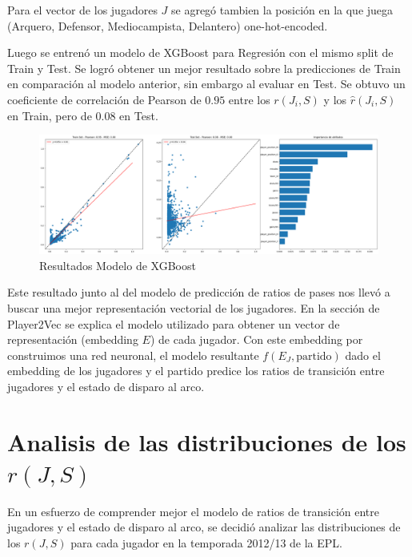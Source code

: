 \documentclass[
  a4paper,
]{article}
\begin{document}
Para el vector de los jugadores \(J\) se agregó tambien la posición en
la que juega (Arquero, Defensor, Mediocampista, Delantero)
one-hot-encoded.

Luego se entrenó un modelo de XGBoost para Regresión con el mismo split
de Train y Test. Se logró obtener un mejor resultado sobre la
predicciones de Train en comparación al modelo anterior, sin embargo al
evaluar en Test. Se obtuvo un coeficiente de correlación de Pearson de
\(0.95\) entre los \(r(J_i, S)\) y los \(\hat{r}(J_i, S)\) en Train,
pero de \(0.08\) en Test.

\begin{figure}
  \includegraphics{recursos_pdf/graficos/xgb_shots.png}
    \caption{Resultados Modelo de XGBoost}
\end{figure}

Este resultado junto al del modelo de predicción de ratios de pases nos
llevó a buscar una mejor representación vectorial de los jugadores. En
la sección de Player2Vec se explica el modelo utilizado para obtener un
vector de representación (embedding \(E\)) de cada jugador. Con este
embedding por construimos una red neuronal, el modelo resultante
\(f(E_{J}, \text{partido})\) dado el embedding de los jugadores y el
partido predice los ratios de transición entre jugadores y el estado de
disparo al arco.

\newpage

\hypertarget{analisis-de-las-distribuciones-de-los-rj-s}{%
\section{\texorpdfstring{\textbf{Analisis de las distribuciones de los
\(r(J, S)\)}}{Analisis de las distribuciones de los r(J, S)}}\label{analisis-de-las-distribuciones-de-los-rj-s}}

En un esfuerzo de comprender mejor el modelo de ratios de transición
entre jugadores y el estado de disparo al arco, se decidió analizar las
distribuciones de los \(r(J, S)\) para cada jugador en la temporada
2012/13 de la EPL.
\end{document}
